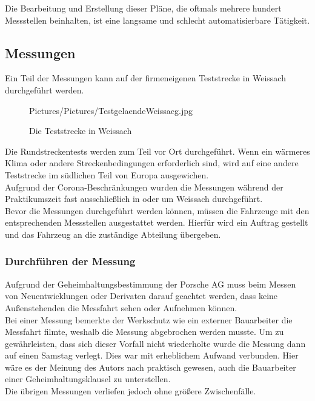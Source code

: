 Die Bearbeitung und Erstellung dieser Pläne, die oftmals mehrere hundert Messstellen beinhalten, ist eine langsame und schlecht automatisierbare Tätigkeit. 

\subsection{Messungen}

Ein Teil der Messungen kann auf der firmeneigenen Teststrecke in Weissach durchgeführt werden.

\begin{figure}[H]
	\begin{center}
		\begin{overpic}[width=\linewidth]{Pictures/Pictures/TestgelaendeWeissacg.jpg}
			
		\end{overpic}
	
	\caption{Die Teststrecke in Weissach}
	\label{testweissach}
	\end{center}
\end{figure}

Die Rundstreckentests werden zum Teil vor Ort durchgeführt. Wenn ein wärmeres Klima oder andere Streckenbedingungen erforderlich sind, wird auf eine andere Teststrecke im südlichen Teil von Europa ausgewichen.\\
Aufgrund der Corona-Beschränkungen wurden die Messungen während der Praktikumszeit fast ausschließlich in oder um Weissach durchgeführt. \\

Bevor die Messungen durchgeführt werden können, müssen die Fahrzeuge mit den entsprechenden Messstellen ausgestattet werden. Hierfür wird ein Auftrag gestellt und das Fahrzeug an die zuständige Abteilung übergeben. \\

\subsubsection{Durchführen der Messung}

Aufgrund der Geheimhaltungsbestimmung der Porsche AG muss beim Messen von Neuentwicklungen oder Derivaten darauf geachtet werden, dass keine Außenstehenden die Messfahrt sehen oder Aufnehmen können. \\
Bei einer Messung bemerkte der Werkschutz wie ein externer Bauarbeiter die Messfahrt filmte, weshalb die Messung abgebrochen werden musste. Um zu gewährleisten, dass sich dieser Vorfall nicht wiederholte wurde die Messung dann auf einen Samstag verlegt. Dies war mit erheblichem Aufwand verbunden. Hier wäre es der Meinung des Autors nach praktisch gewesen, auch die Bauarbeiter einer Geheimhaltungsklausel zu unterstellen.\\
Die übrigen Messungen verliefen jedoch ohne größere Zwischenfälle. \\

